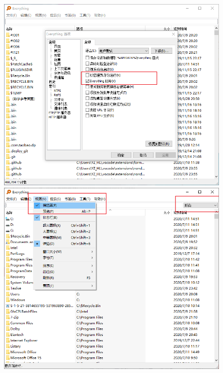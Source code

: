 \documentclass[a5paper]{article}
\begin{document}
            \begin{figure}[htbp]
            \centering
            \begin{minipage}[t]{0.44\textwidth}
            \centering
            \includegraphics[scale=0.20]{2.1-p1.png}
            \end{minipage}
            \begin{minipage}[t]{0.44\textwidth}
            \centering
            \includegraphics[scale=0.20]{2.1-p2.png}
            \end{minipage}
            \end{figure}
\end{document}
